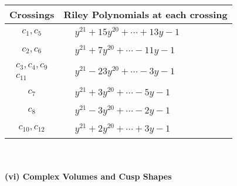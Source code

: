 \documentclass[1p]{elsarticle_modified}
\theoremstyle{definition}
\begin{document}
\begin{tabular}{m{50pt}|m{274pt}}
Crossings & \hspace{64pt}Riley Polynomials at each crossing \\
\hline $$\begin{aligned}c_{1},c_{5}\end{aligned}$$&$\begin{aligned}
&y^{21}+15 y^{20}+\cdots+13 y-1
\end{aligned}$\\
\hline $$\begin{aligned}c_{2},c_{6}\end{aligned}$$&$\begin{aligned}
&y^{21}+7 y^{20}+\cdots-11 y-1
\end{aligned}$\\
\hline $$\begin{aligned}c_{3},c_{4},c_{9}\\c_{11}\end{aligned}$$&$\begin{aligned}
&y^{21}-23 y^{20}+\cdots-3 y-1
\end{aligned}$\\
\hline $$\begin{aligned}c_{7}\end{aligned}$$&$\begin{aligned}
&y^{21}+3 y^{20}+\cdots-5 y-1
\end{aligned}$\\
\hline $$\begin{aligned}c_{8}\end{aligned}$$&$\begin{aligned}
&y^{21}-3 y^{20}+\cdots-2 y-1
\end{aligned}$\\
\hline $$\begin{aligned}c_{10},c_{12}\end{aligned}$$&$\begin{aligned}
&y^{21}+2 y^{20}+\cdots+3 y-1
\end{aligned}$\\
\hline
\end{tabular}\\~\\
\newpage\flushleft \textbf{(vi) Complex Volumes and Cusp Shapes}
\end{document}
